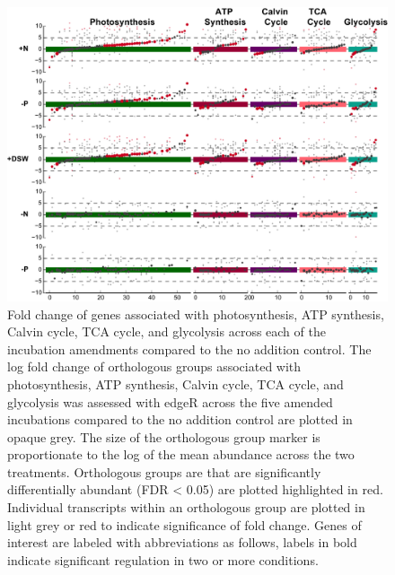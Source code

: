 \begin{figure}[p!]

  \centering
  \includegraphics[width=1\textwidth]{Images/C6_FigureS7_MckewATP.png}
    \caption[Fold change of genes associated with photosynthesis, ATP synthesis, Calvin cycle, TCA cycle, and glycolysis across each of the incubation amendments]{Fold change of genes associated with photosynthesis, ATP synthesis, Calvin cycle, TCA cycle, and glycolysis across each of the incubation amendments compared to the no addition control. The log fold change of orthologous groups associated with photosynthesis, ATP synthesis, Calvin cycle, TCA cycle, and glycolysis was assessed with edgeR across the five amended incubations compared to the no addition control are plotted in opaque grey. The size of the orthologous group marker is proportionate to the log of the mean abundance across the two treatments. Orthologous groups are that are significantly differentially abundant (FDR < 0.05) are plotted highlighted in red. Individual transcripts within an orthologous group are plotted in light grey or red to indicate significance of fold change. Genes of interest are labeled with abbreviations as follows, labels in bold indicate significant regulation in two or more conditions. }
    \label{fig:a5f7}
\end{figure}




